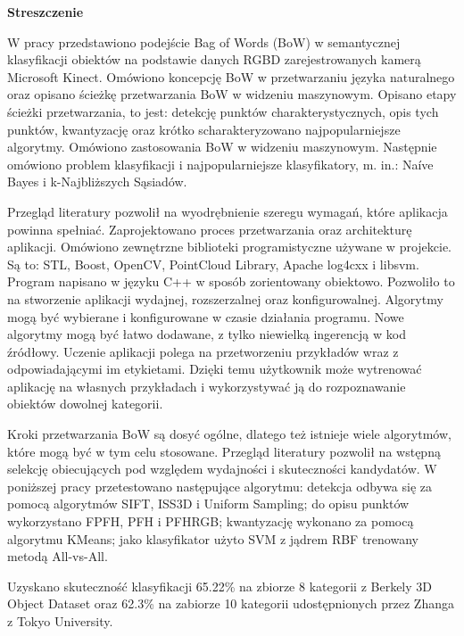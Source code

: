 \begin{center}
\begin{LARGE}\textbf{Streszczenie}\end{LARGE}
\end{center}

\vspace{1.0cm}

	W pracy przedstawiono podejście Bag of Words (BoW) w semantycznej klasyfikacji obiektów na podstawie danych RGBD zarejestrowanych kamerą Microsoft Kinect. Omówiono koncepcję BoW w przetwarzaniu języka naturalnego oraz opisano ścieżkę przetwarzania BoW w widzeniu maszynowym. Opisano etapy ścieżki przetwarzania, to jest: detekcję punktów charakterystycznych, opis tych punktów, kwantyzację oraz krótko scharakteryzowano najpopularniejsze algorytmy. Omówiono zastosowania BoW w widzeniu maszynowym. Następnie omówiono problem klasyfikacji i najpopularniejsze klasyfikatory, m. in.: Na\'ive Bayes i k-Najbliższych Sąsiadów. 
	
	Przegląd literatury pozwolił na wyodrębnienie szeregu wymagań, które aplikacja powinna spełniać. Zaprojektowano proces przetwarzania oraz architekturę aplikacji. Omówiono zewnętrzne biblioteki programistyczne używane w projekcie. Są to: STL, Boost, OpenCV, PointCloud Library, Apache log4cxx i libsvm. Program napisano w języku C++ w sposób zorientowany obiektowo. Pozwoliło to na stworzenie aplikacji wydajnej, rozszerzalnej oraz konfigurowalnej. Algorytmy mogą być wybierane i konfigurowane w czasie działania programu. Nowe algorytmy mogą być łatwo dodawane, z tylko niewielką ingerencją w kod źródłowy. Uczenie aplikacji polega na przetworzeniu przykładów wraz z odpowiadającymi im etykietami. Dzięki temu użytkownik może wytrenować aplikację na własnych przykładach i wykorzystywać ją do rozpoznawanie obiektów dowolnej kategorii. 
	
	Kroki przetwarzania BoW są dosyć ogólne, dlatego też istnieje wiele algorytmów, które mogą być w tym celu stosowane. Przegląd literatury pozwolił na wstępną selekcję obiecujących pod względem wydajności i skuteczności kandydatów. W poniższej pracy przetestowano następujące algorytmu: detekcja odbywa się za pomocą algorytmów SIFT, ISS3D i Uniform Sampling; do opisu punktów wykorzystano FPFH, PFH i PFHRGB; kwantyzację wykonano za pomocą algorytmu KMeans; jako klasyfikator użyto SVM z jądrem RBF trenowany metodą All-vs-All.
	
	Uzyskano skuteczność klasyfikacji 65.22\% na zbiorze 8 kategorii z Berkely 3D Object Dataset oraz 62.3\% na zabiorze 10 kategorii udostępnionych przez Zhanga z Tokyo University.
	

